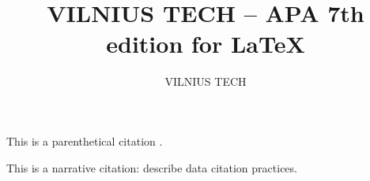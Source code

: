 \documentclass{article}
\title{VILNIUS TECH -- APA 7th edition for \LaTeX}
\author{VILNIUS TECH}
\begin{document}
\maketitle

This is a parenthetical citation \parencite{fenner2019}.

This is a narrative citation: \textcite{fenner2019} describe data citation practices.

\printbibliography
\end{document}
